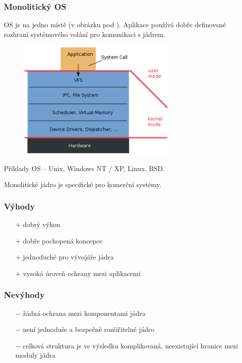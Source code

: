 \subsubsection{Monolitický OS}
OS je na jedno místě (v obrázku pod ). Aplikace používá dobře definované rozhraní systémového volání pro komunikaci s jádrem.
\begin{figure}[H]
\centering
\includegraphics[width=0.7\textwidth]{assets/3_mon_os}
\end{figure}
Příklady OS -- Unix, Windows NT / XP, Linux, BSD.

Monolitické jádro je specifické pro komerční systémy.
\subsubsection*{Výhody}
\begin{itemize}
	\item[$+$] dobrý výkon
	\item[$+$] dobře pochopená koncepce
	\item[$+$] jednoduché pro vývojáře jádra
	\item[$+$] vysoká úroveň ochrany mezi aplikacemi
\end{itemize}
\subsubsection*{Nevýhody}
\begin{itemize}
	\item[$-$] žádná ochrana mezi komponentami jádra
	\item[$-$] není jednoduše a bezpečně rozšiřitelné jádro
	\item[$-$] celková struktura je ve výsledku komplikovaná, neexistující hranice mezi moduly jádra
\end{itemize}

